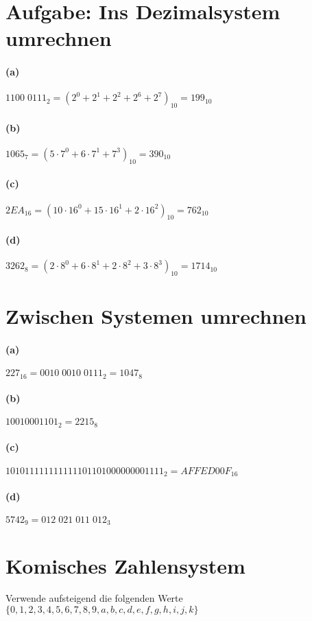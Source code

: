 \documentclass[a4paper]{article}
\begin{document}
\section{Aufgabe: Ins Dezimalsystem umrechnen}
\paragraph{(a)}
$ 1100\;0111_2 = (2^0 + 2^1 + 2^2 + 2^6 + 2^7)_{10} = 199_{10} $
\paragraph{(b)}
$1065_7 = (5\cdot7^0+6\cdot7^1+7^3)_{10}=390_{10}$
\paragraph{(c)}
$2EA_{16} = (10\cdot16^0+15\cdot16^1+2\cdot16^2)_{10} = 762_{10}$
\paragraph{(d)}
$3262_8 = (2\cdot8^0+6\cdot8^1+2\cdot8^2+3\cdot8^3)_{10} = 1714_{10} $


\section{Zwischen Systemen umrechnen}
\paragraph{(a)}
$227_{16} = 0010\;0010\;0111_2 = 1047_8  $
\paragraph{(b)}
$10010001101_2 = 2215_8$
\paragraph{(c)}
$101011111111111101101000000001111_2 = AFFED00F_{16}$
\paragraph{(d)}
$5742_9=012\;021\;011\;012_3$


\section{Komisches Zahlensystem}
Verwende aufsteigend die folgenden Werte\\
$\{0,1,2,3,4,5,6,7,8,9,a,b,c,d,e,f,g,h,i,j,k\} $
\end{document}
